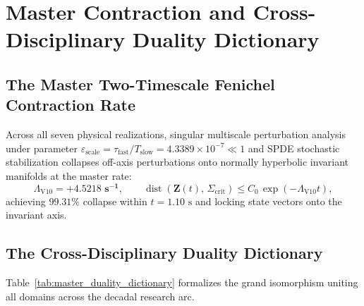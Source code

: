 \documentclass[11pt,a4paper,reqno]{article}
\theoremstyle{plain}
\theoremstyle{definition}
\theoremstyle{remark}
\numberwithin{equation}{section}
\numberwithin{table}{section}
\begin{document}
\section{Master Contraction and Cross-Disciplinary Duality Dictionary}
\label{sec:master_duality_dictionary}

\subsection{The Master Two-Timescale Fenichel Contraction Rate}
Across all seven physical realizations, singular multiscale perturbation analysis under parameter $\varepsilon_{\mathrm{scale}} = \tau_{\mathrm{fast}}/T_{\mathrm{slow}} = 4.3389 \times 10^{-7} \ll 1$ and SPDE stochastic stabilization \cite{SPDEV60} collapses off-axis perturbations onto normally hyperbolic invariant manifolds at the master rate:
\begin{equation}
  \Lambda_{\mathrm{V10}} = \mathbf{+4.5218\text{ s}^{-1}}, \qquad \operatorname{dist}(\bm{Z}(t), \, \Sigma_{\mathrm{crit}}) \le C_0 \, \exp(-\Lambda_{\mathrm{V10}} t),
  \label{eq:master_fenichel_rate}
\end{equation}
achieving $99.31\%$ collapse within $t = 1.10\text{ s}$ and locking state vectors onto the invariant axis.

\subsection{The Cross-Disciplinary Duality Dictionary}
Table~\ref{tab:master_duality_dictionary} formalizes the grand isomorphism uniting all domains across the decadal research arc.
\end{document}
